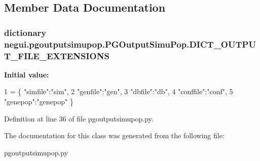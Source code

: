 \subsection{Member Data Documentation}
\subsubsection[{\texorpdfstring{D\+I\+C\+T\+\_\+\+O\+U\+T\+P\+U\+T\+\_\+\+F\+I\+L\+E\+\_\+\+E\+X\+T\+E\+N\+S\+I\+O\+NS}{DICT_OUTPUT_FILE_EXTENSIONS}}]{\setlength{\rightskip}{0pt plus 5cm}dictionary negui.\+pgoutputsimupop.\+P\+G\+Output\+Simu\+Pop.\+D\+I\+C\+T\+\_\+\+O\+U\+T\+P\+U\+T\+\_\+\+F\+I\+L\+E\+\_\+\+E\+X\+T\+E\+N\+S\+I\+O\+NS\hspace{0.3cm}{\ttfamily [static]}}\hypertarget{classnegui_1_1pgoutputsimupop_1_1PGOutputSimuPop_a9c9afd31cd09eedc7187eaf6a48ef74a}{}\label{classnegui_1_1pgoutputsimupop_1_1PGOutputSimuPop_a9c9afd31cd09eedc7187eaf6a48ef74a}
{\bfseries Initial value\+:}
\begin{DoxyCode}
1 = \{ \textcolor{stringliteral}{"simfile"}:\textcolor{stringliteral}{"sim"},
2                                     \textcolor{stringliteral}{"genfile"}:\textcolor{stringliteral}{"gen"},
3                                     \textcolor{stringliteral}{"dbfile"}:\textcolor{stringliteral}{"db"},
4                                     \textcolor{stringliteral}{"conffile"}:\textcolor{stringliteral}{"conf"},
5                                     \textcolor{stringliteral}{"genepop"}:\textcolor{stringliteral}{"genepop"} \}
\end{DoxyCode}


Definition at line 36 of file pgoutputsimupop.\+py.



The documentation for this class was generated from the following file\+:\begin{DoxyCompactItemize}
\item 
pgoutputsimupop.\+py\end{DoxyCompactItemize}
